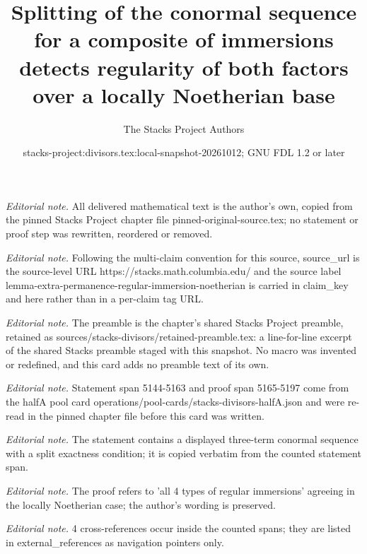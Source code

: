 \documentclass[10pt,a4paper]{amsart}
\title{Splitting of the conormal sequence for a composite of immersions detects regularity of both factors over a locally Noetherian base}
\author{The Stacks Project Authors}
\date{stacks-project:divisors.tex:local-snapshot-20261012; GNU FDL 1.2 or later}
\theoremstyle{plain}
\theoremstyle{definition}
\theoremstyle{remark}
\numberwithin{equation}{subsection}
\begin{document}
\maketitle
\noindent\textit{Editorial note.} All delivered mathematical text is the author's own, copied from the pinned Stacks Project chapter file pinned-original-source.tex; no statement or proof step was rewritten, reordered or removed.\par\medskip
\noindent\textit{Editorial note.} Following the multi-claim convention for this source, source\_url is the source-level URL https://stacks.math.columbia.edu/ and the source label lemma-extra-permanence-regular-immersion-noetherian is carried in claim\_key and here rather than in a per-claim tag URL.\par\medskip
\noindent\textit{Editorial note.} The preamble is the chapter's shared Stacks Project preamble, retained as sources/stacks-divisors/retained-preamble.tex: a line-for-line excerpt of the shared Stacks preamble staged with this snapshot. No macro was invented or redefined, and this card adds no preamble text of its own.\par\medskip
\noindent\textit{Editorial note.} Statement span 5144-5163 and proof span 5165-5197 come from the halfA pool card operations/pool-cards/stacks-divisors-halfA.json and were re-read in the pinned chapter file before this card was written.\par\medskip
\noindent\textit{Editorial note.} The statement contains a displayed three-term conormal sequence with a split exactness condition; it is copied verbatim from the counted statement span.\par\medskip
\noindent\textit{Editorial note.} The proof refers to 'all 4 types of regular immersions' agreeing in the locally Noetherian case; the author's wording is preserved.\par\medskip
\noindent\textit{Editorial note.} 4 cross-references occur inside the counted spans; they are listed in external\_references as navigation pointers only.\par\medskip
\end{document}

